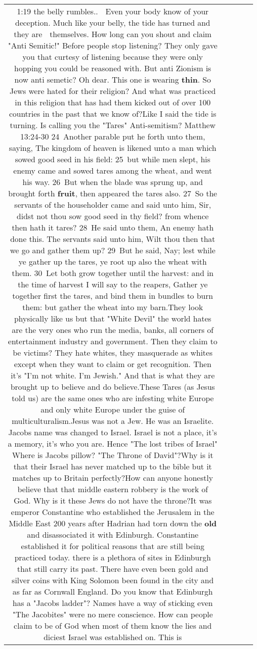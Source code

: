 \documentclass[11pt]{article}
\newlength\mylength
\begin{document}
\begin{center}
\begin{longtable}{|C{.65\mylength}|C{.30\mylength}|C{.12\mylength}|C{.12\mylength}|C{.12\mylength}|}
  \small 1:19 the belly rumbles.. 😬 Even your body know of your deception. Much like your belly, the tide has turned and they are 💩 themselves. How long can you shout and claim "Anti Semitic!" Before people stop listening? They only gave you that curtesy of listening because they were only hopping you could be reasoned with. But anti Zionism is now anti semetic? Oh dear. This one is wearing \textbf{thin}. So Jews were hated for their religion? And what was practiced in this religion that has had them kicked out of over 100 countries in the past that we know of?Like I said the tide is turning. Is calling you the "Tares" Anti-semitism? Matthew 13:24-30 24 Another parable put he forth unto them, saying, The kingdom of heaven is likened unto a man which sowed good seed in his field: 25 but while men slept, his enemy came and sowed tares among the wheat, and went his way. 26 But when the blade was sprung up, and brought forth \textbf{fruit}, then appeared the tares also. 27 So the servants of the householder came and said unto him, Sir, didst not thou sow good seed in thy field? from whence then hath it tares? 28 He said unto them, An enemy hath done this. The servants said unto him, Wilt thou then that we go and gather them up? 29 But he said, Nay; lest while ye gather up the tares, ye root up also the wheat with them. 30 Let both grow together until the harvest: and in the time of harvest I will say to the reapers, Gather ye together first the tares, and bind them in bundles to burn them: but gather the wheat into my barn.They look physically like us but that "White Devil" the world hates are the very ones who run the media, banks, all corners of entertainment industry and government. Then they claim to be victims?  They hate whites, they masquerade as whites except when they want to claim or get recognition. Then it's "I'm not white. I'm Jewish." And that is what they are brought up to believe and do believe.These Tares (as Jesus told us) are the same ones who are infesting white Europe and only white Europe under the guise of multiculturalism.Jesus was not a Jew. He was an Israelite. Jacobs name was changed to Israel. Israel is not a place, it's a memory, it's who you are. Hence "The lost tribes of Israel" Where is Jacobs pillow? "The Throne of David"?Why is it that their Israel has never matched up to the bible but it matches up to Britain perfectly?How can anyone honestly believe that that middle eastern robbery is the work of God. Why is it these Jews do not have the throne?It was emperor Constantine who established the Jerusalem in the Middle East 200 years after Hadrian had torn down the \textbf{old} and disassociated it with Edinburgh. Constantine established it for political reasons that are still being practiced today. there is a plethora of sites in Edinburgh that still carry its past. There have even been gold and silver coins with King Solomon been found in the city and as far as Cornwall England. Do you know that Edinburgh has a "Jacobs ladder"? Names have a way of sticking even "The Jacobites" were no mere conscience. How can people claim to be of God when most of them know the lies and diciest Israel was established on. This is 
\end{longtable}
\end{center}
\end{document}
